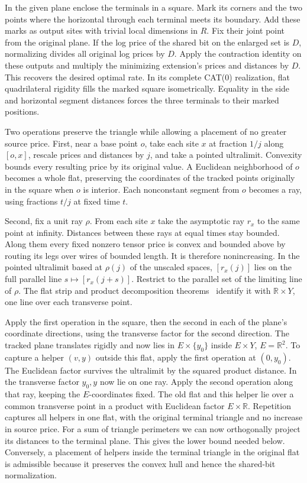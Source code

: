 \documentclass[11pt,letterpaper]{article}
\begin{document}
In the given plane enclose the terminals in a square. Mark its corners and the two points where the horizontal through each terminal meets its boundary. Add these marks as output sites with trivial local dimensions in \(R\). Fix their joint point from the original plane. If the log price of the shared bit on the enlarged set is \(D\), normalizing divides all original log prices by \(D\). Apply the contraction identity on these outputs and multiply the minimizing extension's prices and distances by \(D\). This recovers the desired optimal rate. In its complete CAT(0) realization, flat quadrilateral rigidity fills the marked square isometrically. Equality in the side and horizontal segment distances forces the three terminals to their marked positions.

Two operations preserve the triangle while allowing a placement of no greater source price. First, near a base point \(o\), take each site \(x\) at fraction \(1/j\) along \([o,x]\), rescale prices and distances by \(j\), and take a pointed ultralimit. Convexity bounds every resulting price by its original value. A Euclidean neighborhood of \(o\) becomes a whole flat, preserving the coordinates of the tracked points originally in the square when \(o\) is interior. Each nonconstant segment from \(o\) becomes a ray, using fractions \(t/j\) at fixed time \(t\).

Second, fix a unit ray \(\rho\). From each site \(x\) take the asymptotic ray \(r_x\) to the same point at infinity. Distances between these rays at equal times stay bounded. Along them every fixed nonzero tensor price is convex and bounded above by routing its legs over wires of bounded length. It is therefore nonincreasing. In the pointed ultralimit based at \(\rho(j)\) of the unscaled spaces, \([r_x(j)]\) lies on the full parallel line \(s\mapsto[r_x(j+s)]\). Restrict to the parallel set of the limiting line of \(\rho\). The flat strip and product decomposition theorems~\cite[Theorems~2.9 and~2.11]{bridson-curvature} identify it with \(\mathbb R\times Y\), one line over each transverse point.

Apply the first operation in the square, then the second in each of the plane's coordinate directions, using the transverse factor for the second direction. The tracked plane translates rigidly and now lies in \(E\times\{y_0\}\) inside \(E\times Y\), \(E=\mathbb R^2\). To capture a helper \((v,y)\) outside this flat, apply the first operation at \((0,y_0)\). The Euclidean factor survives the ultralimit by the squared product distance. In the transverse factor \(y_0,y\) now lie on one ray. Apply the second operation along that ray, keeping the \(E\)-coordinates fixed. The old flat and this helper lie over a common transverse point in a product with Euclidean factor \(E\times\mathbb R\). Repetition captures all helpers in one flat, with the original terminal triangle and no increase in source price. For a sum of triangle perimeters we can now orthogonally project its distances to the terminal plane. This gives the lower bound needed below. Conversely, a placement of helpers inside the terminal triangle in the original flat is admissible because it preserves the convex hull and hence the shared-bit normalization.
\end{document}
